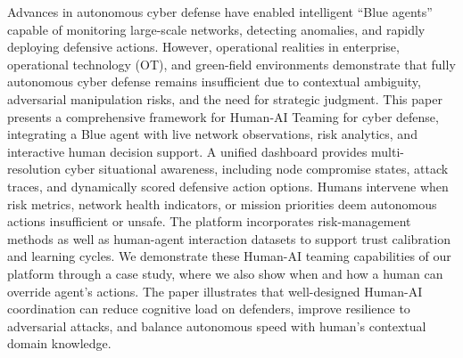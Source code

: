 Advances in autonomous cyber defense have enabled intelligent “Blue agents” capable of monitoring large-scale networks, detecting anomalies, and rapidly deploying defensive actions. However, operational realities in enterprise, operational technology (OT), and green-field environments demonstrate that fully autonomous cyber defense remains insufficient due to contextual ambiguity, adversarial manipulation risks, and the need for strategic judgment. This paper presents a comprehensive framework for Human-AI Teaming for cyber defense, integrating a Blue agent with live network observations, risk analytics, and interactive human decision support. A unified dashboard provides multi-resolution cyber situational awareness, including node compromise states, attack traces, and dynamically scored defensive action options. Humans intervene when risk metrics, network health indicators, or mission priorities deem autonomous actions insufficient or unsafe. The platform incorporates risk-management methods as well as human-agent interaction datasets to support trust calibration and learning cycles. We demonstrate these Human-AI teaming capabilities of our platform through a case study, where we also show when and how a human can override agent's actions. The paper illustrates that well-designed Human-AI coordination can reduce cognitive load on defenders, improve resilience to adversarial attacks, and balance autonomous speed with human's contextual domain knowledge.